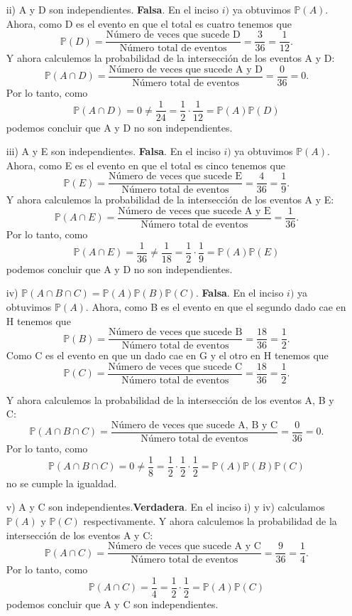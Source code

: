 \documentclass[11pt,letterpaper]{article}
\newcommand{\mP}{\mathbb{P}}
\begin{document}
\begin{itemize}
\begin{itemize}
\item[ii)] A y D son independientes. \textbf{Falsa}. En el inciso $i)$ ya obtuvimos $\mP(A)$. Ahora, como D es el evento en que el total es cuatro tenemos que
$$\mP(D)=\frac{\text{Número de veces que sucede D}}{\text{Número total de eventos}}=\frac{3}{36}=\frac{1}{12}.$$
Y ahora calculemos la probabilidad de la intersección de los eventos A y D:
$$\mP(A\cap D)= \frac{\text{Número de veces que sucede A y D}}{\text{Número total de eventos}}=\frac{0}{36}=0.$$
Por lo tanto, como
$$\mP(A\cap D)= 0 \neq \frac{1}{24}=\frac{1}{2}\cdot \frac{1}{12}=\mP(A)\mP(D)$$
podemos concluir que A y D no son independientes.

\item[iii)] A y E son independientes. \textbf{Falsa}. En el inciso $i)$ ya obtuvimos $\mP(A)$. Ahora, como E es el evento en que el total es cinco tenemos que
$$\mP(E)=\frac{\text{Número de veces que sucede E}}{\text{Número total de eventos}}=\frac{4}{36}=\frac{1}{9}.$$
Y ahora calculemos la probabilidad de la intersección de los eventos A y E:
$$\mP(A\cap E)= \frac{\text{Número de veces que sucede A y E}}{\text{Número total de eventos}}=\frac{1}{36}.$$
Por lo tanto, como
$$\mP(A\cap E)= \frac{1}{36} \neq \frac{1}{18}=\frac{1}{2}\cdot \frac{1}{9}=\mP(A)\mP(E)$$
podemos concluir que A y D no son independientes.

\item[iv)] $\mP(A \cap B \cap C) = \mP (A)\mP (B)\mP (C)$. \textbf{Falsa}. En el inciso $i)$ ya obtuvimos $\mP(A)$. Ahora, como B es el evento en que el segundo dado cae en H tenemos que
$$\mP(B)=\frac{\text{Número de veces que sucede B}}{\text{Número total de eventos}}=\frac{18}{36}=\frac{1}{2}.$$
Como C es el evento en que un dado cae en G y el otro en H tenemos que
$$\mP(C)=\frac{\text{Número de veces que sucede C}}{\text{Número total de eventos}}=\frac{18}{36}=\frac{1}{2}.$$

Y ahora calculemos la probabilidad de la intersección de los eventos A, B y C:
$$\mP(A\cap B \cap C)= \frac{\text{Número de veces que sucede A, B y C}}{\text{Número total de eventos}}=\frac{0}{36}=0.$$
Por lo tanto, como
$$\mP(A\cap B \cap C)= 0 \neq \frac{1}{8}=\frac{1}{2}\cdot \frac{1}{2}\cdot \frac{1}{2}=\mP(A)\mP(B)\mP(C)$$
no se cumple la igualdad.

\item[v)] A y C son independientes.\textbf{Verdadera}. En el inciso i) y iv) calculamos $\mP(A)$ y $\mP(C)$ respectivamente. Y ahora calculemos la probabilidad de la intersección de los eventos A y C:
$$\mP(A\cap C)= \frac{\text{Número de veces que sucede A y C}}{\text{Número total de eventos}}=\frac{9}{36}=\frac{1}{4}.$$
Por lo tanto, como
$$\mP(A\cap C)= \frac{1}{4}=\frac{1}{2}\cdot \frac{1}{2}=\mP(A)\mP(C)$$
podemos concluir que A y C son independientes.


\end{itemize}
\end{itemize}
\end{document}
